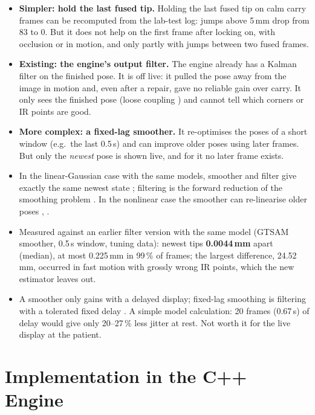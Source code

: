 \documentclass[11pt,a4paper,fleqn]{article}
\begin{document}
\begin{itemize}
  \item \textbf{Simpler: hold the last fused tip.} Holding the last fused tip on calm carry frames can be recomputed
        from the lab-test log: jumps above 5\,mm drop from 83 to 0. But it does not help on the first frame after
        locking on, with occlusion or in motion, and only partly with jumps between two fused frames.
  \item \textbf{Existing: the engine's output filter.} The engine already has a Kalman filter on the finished pose.
        It is off live: it pulled the pose away from the image in motion and, even after a repair, gave no reliable
        gain over carry. It only sees the finished pose (loose coupling \cite[p.~493]{tobergte2009robust}) and cannot
        tell which corners or IR points are good.
  \item \textbf{More complex: a fixed-lag smoother.} It re-optimises the poses of a short window (e.g.\ the last
        0.5\,s) and can improve older poses using later frames. But only the \emph{newest} pose is shown live, and
        for it no later frame exists.
  \item In the linear-Gaussian case with the same models, smoother and filter give exactly the same newest state
        \cite[Thm.~8.2]{saerkkae2013bayesian}; filtering is the forward reduction of the smoothing problem
        \cite[§8.2]{triggs2000bundle}. In the nonlinear case the smoother can re-linearise older poses
        \cite[§8.2, pp.~334--335]{triggs2000bundle}, \cite[Sec.~VII]{kaess2012concurrent}.
  \item Measured against an earlier filter version with the same model (GTSAM smoother, 0.5\,s window, tuning data):
        newest tips \textbf{0.0044\,mm} apart (median), at most 0.225\,mm in 99\,\% of frames; the largest
        difference, 24.52\,mm, occurred in fast motion with grossly wrong IR points, which the new estimator leaves
        out.
  \item A smoother only gains with a delayed display; fixed-lag smoothing is filtering with a tolerated fixed delay
        \cite[p.~160]{saerkkae2013bayesian}. A simple model calculation: 20 frames (0.67\,s) of delay would give only
        20--27\,\% less jitter at rest. Not worth it for the live display at the patient.
\end{itemize}

\section{Implementation in the C++ Engine}
\label{sec:cpp}
\end{document}
